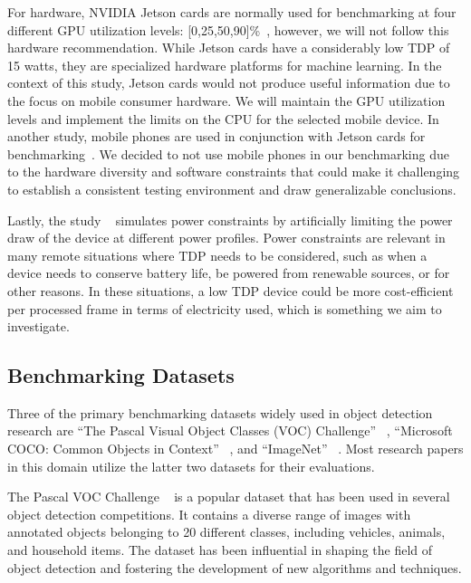\documentclass[10pt,twocolumn,letterpaper]{article}
\begin{document}
For hardware, NVIDIA Jetson cards are normally used for benchmarking at four different GPU utilization levels: [0,25,50,90]\%~\cite{lee2021benchmarking},
however, we will not follow this hardware recommendation.
While Jetson cards have a considerably low TDP of 15 watts, they are specialized hardware platforms for machine learning.
In the context of this study, Jetson cards would not produce useful information due to the focus on mobile consumer hardware.
We will maintain the GPU utilization levels and implement the limits on the CPU for the selected mobile device.
In another study, mobile phones are used in conjunction with Jetson cards for benchmarking~\cite{li2021npas}.
We decided to not use mobile phones in our benchmarking due to the hardware diversity and software constraints that could make it challenging to establish a consistent testing environment and draw generalizable conclusions.

Lastly, the study ~\cite{lee2021benchmarking} simulates power constraints by artificially limiting the power draw of the device at different power profiles.
Power constraints are relevant in many remote situations where TDP needs to be considered, such as when a device needs to conserve battery life, be powered from renewable sources, or for other reasons.
In these situations, a low TDP device could be more cost-efficient per processed frame in terms of electricity used, which is something we aim to investigate.

\subsection{Benchmarking Datasets}
\label{subsec:BenchmarkingDatasets}

Three of the primary benchmarking datasets widely used in object detection research are “The Pascal Visual Object Classes (VOC) Challenge” ~\cite{everingham2012pascal}, “Microsoft COCO: Common Objects in Context” ~\cite{lin2015microsoft}, and “ImageNet” ~\cite{imagenet}.
Most research papers in this domain utilize the latter two datasets for their evaluations.

The Pascal VOC Challenge ~\cite{everingham2012pascal} is a popular dataset that has been used in several object detection competitions.
It contains a diverse range of images with annotated objects belonging to 20 different classes, including vehicles, animals, and household items.
The dataset has been influential in shaping the field of object detection and fostering the development of new algorithms and techniques.
\end{document}
